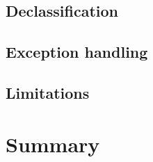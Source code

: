 \subsection{Declassification}




\subsection{Exception handling}


\subsection{Limitations}
 

\section{Summary}